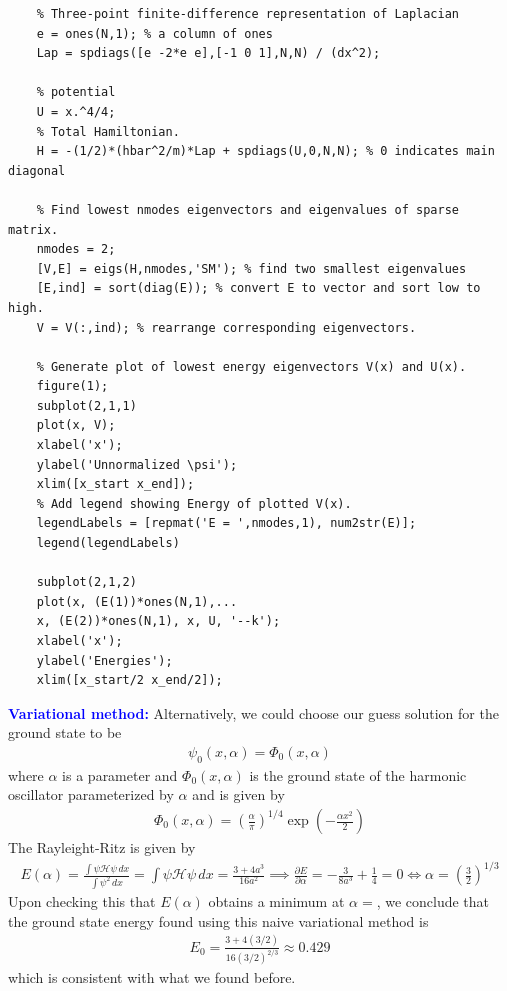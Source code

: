 \documentclass{article}
\theoremstyle{definition}
\newcommand{\p}{\partial}
\newcommand{\ham}{\mathcal{H}}
\newcommand{\al}{\alpha}
\newcommand{\f}[2]{\frac{#1}{#2}}
\newcommand{\lp}{\left(}
\newcommand{\rp}{\right)}
\begin{document}
\begin{enumerate}[label=(\alph*)]
\begin{lstlisting}
	% Three-point finite-difference representation of Laplacian
	e = ones(N,1); % a column of ones
	Lap = spdiags([e -2*e e],[-1 0 1],N,N) / (dx^2);
	
	% potential
	U = x.^4/4;
	% Total Hamiltonian.
	H = -(1/2)*(hbar^2/m)*Lap + spdiags(U,0,N,N); % 0 indicates main diagonal 
	
	% Find lowest nmodes eigenvectors and eigenvalues of sparse matrix.
	nmodes = 2; 
	[V,E] = eigs(H,nmodes,'SM'); % find two smallest eigenvalues
	[E,ind] = sort(diag(E)); % convert E to vector and sort low to high.
	V = V(:,ind); % rearrange corresponding eigenvectors.
		
	% Generate plot of lowest energy eigenvectors V(x) and U(x).
	figure(1);
	subplot(2,1,1)
	plot(x, V);
	xlabel('x');
	ylabel('Unnormalized \psi');
	xlim([x_start x_end]);
	% Add legend showing Energy of plotted V(x).
	legendLabels = [repmat('E = ',nmodes,1), num2str(E)];
	legend(legendLabels)
	
	subplot(2,1,2)
	plot(x, (E(1))*ones(N,1),...
	x, (E(2))*ones(N,1), x, U, '--k');
	xlabel('x');
	ylabel('Energies');
	xlim([x_start/2 x_end/2]);
	\end{lstlisting}
	
	
	
	
	\textbf{\textcolor{blue}{Variational method:}} Alternatively, we could choose our guess solution for the ground state to be 
	\begin{align*}
	\psi_0(x,\al) = \Phi_0(x,\al)
	\end{align*}
	where $\al$ is a parameter and $\Phi_0(x,\al)$ is the ground state of the harmonic oscillator parameterized by $\al$ and is given by  
	\begin{align*}
	\Phi_0(x,\al) = \lp \f{\al}{\pi} \rp^{1/4} \exp\lp - \f{\al x^2}{2}  \rp
	\end{align*}
	The Rayleight-Ritz is given by 
	\begin{align*}
	E(\al) = \f{\int \psi \ham \psi\,dx}{\int \psi^2\,dx} = \int \psi \ham \psi\,dx = \f{3+4a^3}{16a^2} \implies \f{\p E}{\p \al} = -\f{3}{8a^3} + \f{1}{4} =0 \iff \al = \lp\f{3}{2}\rp^{1/3} 
	\end{align*}
	Upon checking this that $E(\al)$ obtains a minimum at $\al = $, we conclude that the ground state energy found using this naive variational method is 
	\begin{align*}
	\boxed{E_0 = \f{3+4(3/2)}{16(3/2)^{2/3}} \approx 0.429}
	\end{align*}
	which is consistent with what we found before. \\
	

\end{enumerate}
\end{document}
